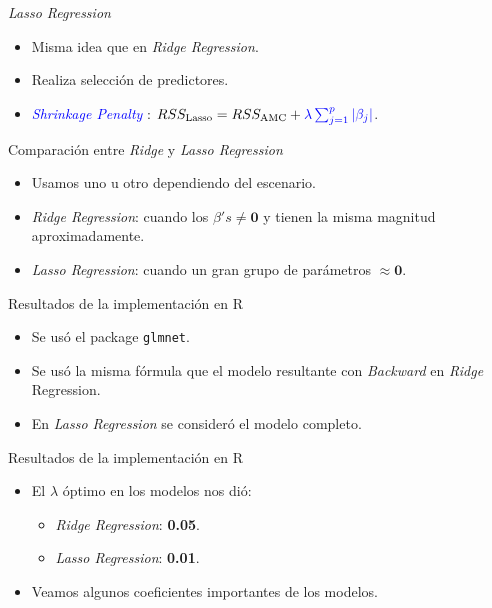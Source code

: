 \documentclass[11pt]{beamer}
\newcommand{\B}{\beta}
\newcommand{\cod}[1]{\texttt{\frenchspacing#1}}
\begin{document}
\begin{frame}{\textit{Lasso Regression}}
	\begin{itemize}
		\item Misma idea que en \textit{Ridge Regression}.
		\pause
		\item Realiza selección de predictores.
		\pause
		\item \textcolor{blue}{\textit{Shrinkage Penalty}} : $RSS_{\text{Lasso}} = RSS_{\text{AMC}} + \textcolor{blue}{\lambda \sum^p_{j=1} |\beta_j|}$.
	\end{itemize}
\end{frame}

\begin{frame}{Comparación entre \textit{Ridge} y \textit{Lasso Regression}}
	\begin{itemize}
		\item Usamos uno u otro dependiendo del escenario.
		\pause
		\item \textit{Ridge Regression}: cuando los $\B's \not = \mathbf{0}$ y tienen la misma magnitud aproximadamente.
		\pause
		\item \textit{Lasso Regression}: cuando un gran grupo de parámetros $\approx \mathbf{0}$.
	\end{itemize}
\end{frame}

\begin{frame}{Resultados de la implementación en R}
	\begin{itemize}
		\item Se usó el package \cod{glmnet}.
		\pause
		\item Se usó la misma fórmula que el modelo resultante con \textit{Backward} en \textit{Ridge} Regression.
		\pause
		\item En \textit{Lasso Regression} se consideró el modelo completo.
	\end{itemize}
\end{frame}

\begin{frame}{Resultados de la implementación en R}
	\begin{itemize}
		\item El $\lambda$ óptimo en los modelos nos dió:
		\pause
		\begin{itemize}
			\item \textit{Ridge Regression}: \textbf{0.05}.
			\item \textit{Lasso Regression}: \textbf{0.01}.
		\end{itemize}
		\pause
		\item Veamos algunos coeficientes importantes de los modelos.
	\end{itemize}
\end{frame}
\end{document}
